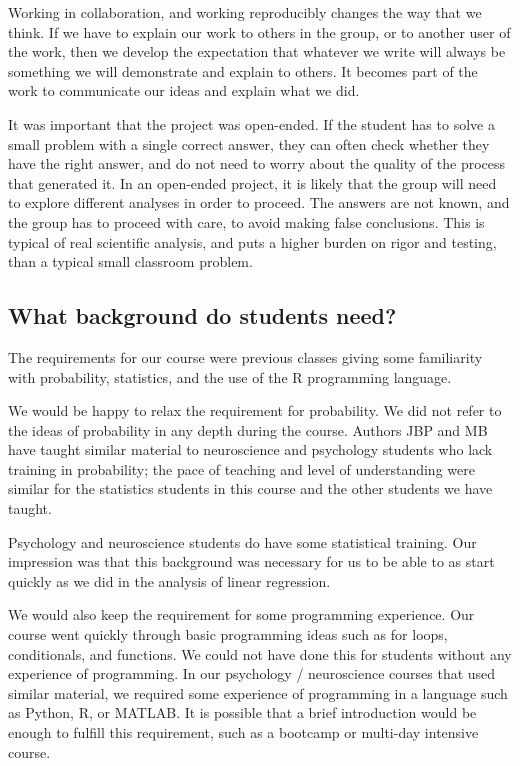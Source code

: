 Working in collaboration, and working reproducibly changes the way that we
think.  If we have to explain our work to others in the group, or to
another user of the work, then we develop the expectation that whatever we
write will always be something we will demonstrate and explain to others.  It
becomes part of the work to communicate our ideas and explain what we did.

It was important that the project was open-ended.  If the student has to solve
a small problem with a single correct answer, they can often check
whether they have the right answer, and do not need to worry about the quality
of the process that generated it.  In an open-ended project, it is likely that
the group will need to explore different analyses in order to proceed.
The answers are not known, and the group has to proceed with care, to avoid
making false conclusions.  This is typical of real scientific analysis, and
puts a higher burden on rigor and testing, than a typical small classroom
problem.

\subsection{What background do students need?}

The requirements for our course were previous classes giving some familiarity
with probability, statistics, and the use of the R programming language.

We would be happy to relax the requirement for probability.  We did not refer
to the ideas of probability in any depth during the course.  Authors JBP and
MB have taught similar material to neuroscience and psychology students who
lack training in probability; the pace of teaching and level of understanding
were similar for the statistics students in this course and the other
students we have taught.

Psychology and neuroscience students do have some statistical training.  Our
impression was that this background was necessary for us to be able to as
start quickly as we did in the analysis of linear regression.

We would also keep the requirement for some programming experience.  Our
course went quickly through basic programming ideas such as for loops,
conditionals, and functions.  We could not have done this for students without
any experience of programming.  In our psychology / neuroscience courses that
used similar material, we required some experience of programming in a
language such as Python, R, or MATLAB.  It is possible that a brief
introduction would be enough to fulfill this requirement, such as a bootcamp
or multi-day intensive course.

